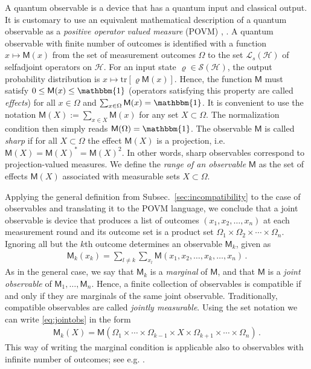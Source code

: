 \documentclass[12pt]{iopart}
\theoremstyle{definition}
\newcommand{\hi}{\mathcal{H}} %
\newcommand{\lsh}{\mathcal{L}_s(\hi)} %
\newcommand{\sh}{\mathcal{S(H)}} %
\renewcommand{\tr}[1]{\textrm{tr}\left[#1\right]} %
\newcommand{\id}{\mathbbm{1}} %
\newcommand{\Mo}{\mathsf{M}}%
\begin{document}
A quantum observable is a device that has a quantum input and classical output.
It is customary to use an equivalent mathematical description of a quantum observable as a \emph{positive operator valued measure} (POVM) \cite{OQP97}, \cite{MLQT12}.
A quantum observable with finite number of outcomes is identified with a function $x\mapsto \Mo(x)$ from the set of measurement outcomes $\Omega$ to the set $\lsh$ of selfadjoint operators on $\hi$.
For an input state $\varrho\in\sh$, the output probability distribution is $x \mapsto \tr{\varrho\Mo(x)}$.
Hence, the function $\Mo$ must satisfy $0\leq\Mo(x)\leq\id$ 
(operators satisfying this property are called \emph{effects}) 
for all $x\in\Omega$ and $\sum_{x\in\Omega} \Mo(x) = \id$. 
It is convenient to use the notation $\Mo(X) := \sum_{x\in X} \Mo(x)$ for any set $X\subset\Omega$.
The normalization condition then simply reads $\Mo(\Omega)=\id$. 
The observable $\Mo$ is called \emph{sharp} if for all $X\subset\Omega$ 
the effect $\Mo(X)$ is a projection, i.e. $\Mo(X)=\Mo(X)^*=\Mo(X)^2$. 
In other words, sharp observables correspond to projection-valued measures. 
We define the \emph{range of an observable} $\Mo$ as the set of effects $\Mo(X)$
associated with measurable sets $X\subset\Omega$.

Applying the general definition from Subsec.~\ref{sec:incompatibility} to the case of observables and translating it to the POVM language, we conclude that a joint observable is device that produces a list of outcomes $(x_1,x_2,\ldots,x_n)$ at each measurement round and its outcome set is a product set $\Omega_1\times\Omega_2\times\cdots\times\Omega_n$.
Ignoring all but the $k$th outcome determines an observable $\Mo_k$, given as
\begin{align}\label{eq:jointobs}
\Mo_k(x_k) = \sum_{l \neq k}\sum_{x_l} \Mo(x_1,x_2,\ldots,x_k,\ldots,x_n) \, .
\end{align}
As in the general case, we say that $\Mo_k$ is a \emph{marginal} of $\Mo$, and that $\Mo$ is a \emph{joint observable} of $\Mo_1,\ldots,\Mo_n$.
Hence, a finite collection of observables is compatible if and only if they are marginals of the same joint observable.
Traditionally, compatible observables are called \emph{jointly measurable}.
Using the set notation we can write \eqref{eq:jointobs} in the form
\begin{align}\label{eq:jointobs2}
\Mo_k(X) = \Mo(\Omega_1 \times \cdots \times \Omega_{k-1} \times X \times \Omega_{k+1} \times\cdots\times\Omega_n ) \, .
\end{align}
This way of writing the marginal condition is applicable also to observables with infinite number of outcomes; see e.g. \cite{LaYl04}. 
\end{document}
